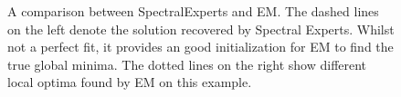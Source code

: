 \begin{figure}[t]
  \centering
    \hspace{-2em}
  \caption{A comparison between SpectralExperts and EM. The dashed lines
  on the left denote the solution recovered by Spectral Experts. Whilst
  not a perfect fit, it provides an good initialization for EM to find
  the true global minima. The dotted lines on the right show different
  local optima found by EM on this example.}
  \label{fig:curves}
\end{figure}


